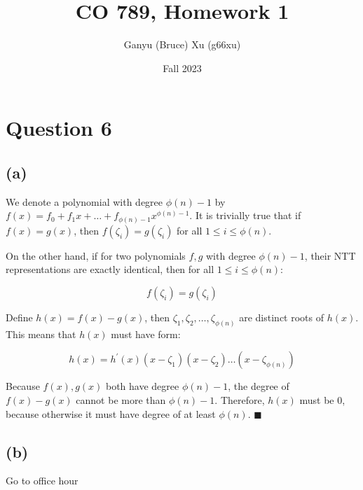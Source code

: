 \documentclass{article}
\title{CO 789, Homework 1}
\author{Ganyu (Bruce) Xu (g66xu)}
\date{Fall 2023}
\begin{document}

\section*{Question 6}
\subsection*{(a)}
We denote a polynomial with degree $\phi(n) - 1$ by $f(x) = f_0 + f_1x + \ldots + f_{\phi(n)-1}x^{\phi(n)-1}$. It is trivially true that if $f(x) = g(x)$, then $f(\zeta_i) = g(\zeta_i)$ for all $1 \leq i \leq \phi(n)$.

On the other hand, if for two polynomials $f, g$ with degree $\phi(n) - 1$, their NTT representations are exactly identical, then for all $1 \leq i \leq \phi(n)$:

$$
f(\zeta_i) = g(\zeta_i)
$$

Define $h(x) = f(x) - g(x)$, then $\zeta_1, \zeta_2, \ldots, \zeta_{\phi(n)}$ are distinct roots of $h(x)$. This means that $h(x)$ must have form:

$$
h(x) = h^\prime(x)(x - \zeta_1)(x - \zeta_2) \ldots (x - \zeta_{\phi(n)})
$$

Because $f(x), g(x)$ both have degree $\phi(n) - 1$, the degree of $f(x) - g(x)$ cannot be more than $\phi(n) - 1$. Therefore, $h(x)$ must be $0$, because otherwise it must have degree of at least $\phi(n)$. $\blacksquare$

\subsection*{(b)}
Go to office hour
\end{document}
